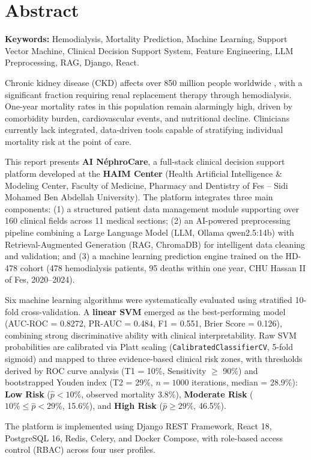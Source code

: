\documentclass[12pt,a4paper,twoside]{report}
\begin{document}
\chapter*{Abstract}
{\singlespacing
\noindent\textbf{Keywords:} Hemodialysis, Mortality Prediction, Machine Learning, Support Vector Machine, Clinical Decision Support System, Feature Engineering, LLM Preprocessing, RAG, Django, React.

\vspace{0.25cm}

Chronic kidney disease (CKD) affects over 850 million people worldwide \cite{jager2019ckd}, with a significant fraction requiring renal replacement therapy through hemodialysis. One-year mortality rates in this population remain alarmingly high, driven by comorbidity burden, cardiovascular events, and nutritional decline. Clinicians currently lack integrated, data-driven tools capable of stratifying individual mortality risk at the point of care.

\vspace{0.2cm}

This report presents \textbf{AI NéphroCare}, a full-stack clinical decision support platform developed at the \textbf{HAIM Center} (Health Artificial Intelligence \& Modeling Center, Faculty of Medicine, Pharmacy and Dentistry of Fes -- Sidi Mohamed Ben Abdellah University). The platform integrates three main components: (1) a structured patient data management module supporting over 160 clinical fields across 11 medical sections; (2) an AI-powered preprocessing pipeline combining a Large Language Model (LLM, Ollama qwen2.5:14b) with Retrieval-Augmented Generation (RAG, ChromaDB) for intelligent data cleaning and validation; and (3) a machine learning prediction engine trained on the HD-478 cohort (478 hemodialysis patients, 95 deaths within one year, CHU Hassan II of Fes, 2020--2024).

\vspace{0.2cm}

Six machine learning algorithms were systematically evaluated using stratified 10-fold cross-validation. A \textbf{linear SVM} emerged as the best-performing model (AUC-ROC = 0.8272, PR-AUC = 0.484, F1 = 0.551, Brier Score = 0.126), combining strong discriminative ability with clinical interpretability. Raw SVM probabilities are calibrated via Platt scaling (\texttt{CalibratedClassifierCV}, 5-fold sigmoid) and mapped to three evidence-based clinical risk zones, with thresholds derived by ROC curve analysis (T1 = 10\%, Sensitivity $\geq$ 90\%) and bootstrapped Youden index (T2 = 29\%, $n=1000$ iterations, median = 28.9\%): \textbf{Low Risk} ($\hat{p} < 10\%$, observed mortality 3.8\%), \textbf{Moderate Risk} ($10\% \leq \hat{p} < 29\%$, 15.6\%), and \textbf{High Risk} ($\hat{p} \geq 29\%$, 46.5\%).

\vspace{0.2cm}

The platform is implemented using Django REST Framework, React 18, PostgreSQL 16, Redis, Celery, and Docker Compose, with role-based access control (RBAC) across four user profiles.
}
\end{document}
